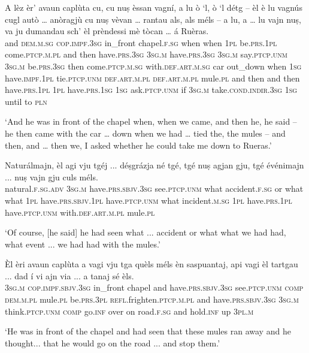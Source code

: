 \begin{linenumbers}
\gll   A lèz èr’ avaun caplùta cu, cu nuṣ èssan vagní, a lu ò `l, ò `l détg – èl è lu vagnús cugl autò … anòragjù cu nuṣ vèvan … rantau als, als méls – a lu, a … lu vajn nuṣ, va ju dumandau sch’ èl prèndessi mè tòcan … á Ruèras. \\
and \textsc{dem.m.sg} \textsc{cop.impf.3sg} in\_front  chapel.\textsc{f.sg} when when \textsc{1pl} be.\textsc{prs.1pl}  come.\textsc{ptcp.m.pl} and then have.\textsc{prs.3sg} \textsc{3sg.m} have.\textsc{prs.3sg} \textsc{3sg.m} say.\textsc{ptcp.unm} {} \textsc{3sg.m}  be.\textsc{prs.3sg} then come.\textsc{ptcp.m.sg} with.\textsc{def.art.m.sg} car {} out\_down when \textsc{1sg} have.\textsc{impf.1pl} {} tie.\textsc{ptcp.unm} \textsc{def.art.m.pl} \textsc{def.art.m.pl} mule.\textsc{pl} {} and then and {} then have.\textsc{prs.1pl} \textsc{1pl} have.\textsc{prs.1sg}  \textsc{1sg} ask.\textsc{ptcp.unm} if \textsc{3sg.m} take.\textsc{cond.indir.3sg} \textsc{1sg} until {} to  \textsc{pln}\\
\end{linenumbers}
\medskip
\glt `And he was in front of the chapel when, when we came, and then he, he said – he then came with the car … down when we had … tied the, the mules – and then, and … then we, I asked whether he could take me down to Rueras.'
\medskip

\begin{linenumbers}
\gll Naturálmajn, èl agi vju tgéj ... déṣgrázja né tgé, tgé nuṣ agjan gju, tgé événimajn ... nuṣ vajn gju culs méls.\\
natural.\textsc{f.sg.adv} \textsc{3sg.m} have.\textsc{prs.sbjv.3sg} see.\textsc{ptcp.unm} what accident.\textsc{f.sg} {} or what what \textsc{1pl} have.\textsc{prs.sbjv.1pl} have.\textsc{ptcp.unm} what incident.\textsc{m.sg} {} \textsc{1pl} have.\textsc{prs.1pl} have.\textsc{ptcp.unm} with.\textsc{def.art.m.pl} mule.\textsc{pl} \\
\end{linenumbers}
\medskip
\glt `Of course, [he said] he had seen what ... accident or what what we had had, what event ... we had had with the mules.' 
\medskip

\begin{linenumbers}
\gll  Èl èri avaun caplùta a vagi vju tga quèls méls èn saspuantaj, api vagi èl tartgau ... dad í vi ajn via ... a tanaj sé èls.  \\
 \textsc{3sg.m} \textsc{cop.impf.sbjv.3sg} in\_front chapel and have.\textsc{prs.sbjv.3sg} see.\textsc{ptcp.unm} \textsc{comp} \textsc{dem.m.pl} mule.\textsc{pl} be.\textsc{prs.3pl} \textsc{refl.}frighten.\textsc{ptcp.m.pl} and have.\textsc{prs.sbjv.3sg} \textsc{3sg.m} think.\textsc{ptcp.unm} {} \textsc{comp} go.\textsc{inf} over on road.\textsc{f.sg} {} and hold.\textsc{inf} up \textsc{3pl.m}\\
\end{linenumbers}
\medskip
\glt `He was in front of the chapel and had seen that these mules ran away and he thought... that he would go on the road ... and stop them.'
\medskip

